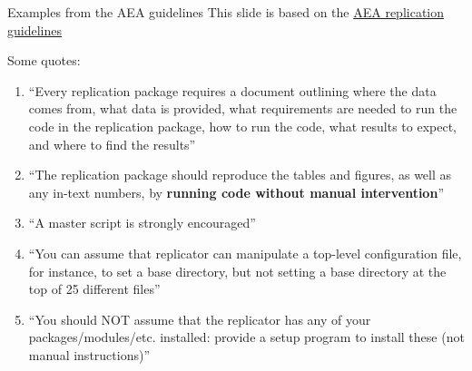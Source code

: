 \documentclass[10pt, aspectratio=169, xcolor=dvipsnames]{beamer}
\let\olditem\item
\renewcommand{\item}{%
\olditem\vspace{0.3em}}
\begin{document}
\begin{frame}[t]{Examples from the AEA guidelines}
    \footnotesize This slide is based on the \href{https://aeadataeditor.github.io/aea-de-guidance/preparing-for-data-deposit.html}{AEA replication guidelines}

    \normalsize\vspace{0.5em} Some quotes: 
    \begin{enumerate}
        \item ``Every replication package requires a document outlining where the data comes from, what data is provided, what requirements are needed to run the code in the replication package, how to run the code, what results to expect, and where to find the results''
        \item ``The replication package should reproduce the tables and figures, as well as any in-text numbers, by \textbf{running code without manual intervention}''
        \item ``A master script is strongly encouraged''
        \item ``You can assume that replicator can manipulate a top-level configuration file, for instance, to set a base directory, but not setting a base directory at the top of 25 different files''
        \item ``You should NOT assume that the replicator has any of your packages/modules/etc. installed: provide a setup program to install these (not manual instructions)''
    \end{enumerate}
\end{frame}
\end{document}
